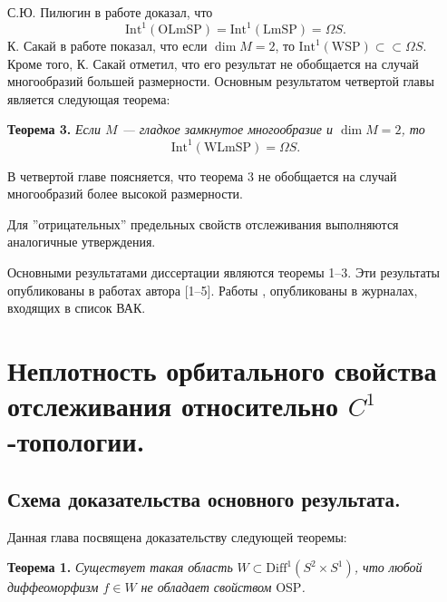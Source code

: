 \documentclass[12pt]{article}
\begin{document}
 С.Ю. Пилюгин в работе \cite{8} доказал, что 
 $$\mbox{Int}^1(\mbox{OLmSP})=\mbox{Int}^1(\mbox{LmSP})=\Omega S.$$ 
 К. Сакай в работе \cite{S} показал, что если $\dim M=2$, то $\mbox{Int}^1(\mbox{WSP})\subset\allowbreak\subset\Omega S$. Кроме того, К. Сакай отметил, что его результат не обобщается на случай многообразий большей размерности. Основным результатом четвертой главы является следующая теорема:

\textbf{Теорема 3.} \textit{Если $M$ --- гладкое замкнутое многообразие и $\dim M=2$, то} 
$$\mbox{Int}^1(\mbox{WLmSP})=\Omega S.$$

В четвертой главе поясняется, что теорема 3 не обобщается на случай многообразий более высокой размерности.

Для ''отрицательных'' предельных свойств отслеживания выполняются аналогичные утверждения.

Основными результатами диссертации являются теоремы 1--3. Эти результаты опубликованы в работах автора [1--5]. Работы \cite{O2}, \cite{O4} опубликованы в журналах, входящих в список ВАК.

\section{Неплотность орбитального свойства отслеживания относительно $C^1$-топологии.}

\subsection{Схема доказательства основного результата.}
Данная глава посвящена доказательству следующей теоремы:
 
\textbf{Теорема 1.} \textit{Существует такая область} $W\subset\mbox{Diff}^1(S^2\times S^1)$\textit{, что любой диффеоморфизм $f\in W$ не обладает свойством} OSP\textit{.}
\end{document}
